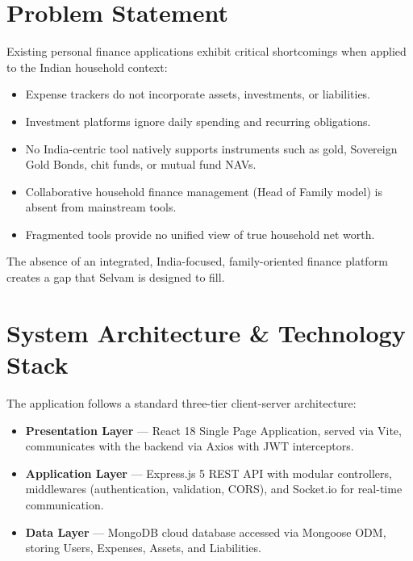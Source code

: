 \documentclass[12pt,a4paper]{article}
\begin{document}
\section{Problem Statement}

Existing personal finance applications exhibit critical shortcomings when applied to the Indian household context:

\begin{itemize}[noitemsep, leftmargin=*]
  \item Expense trackers do not incorporate assets, investments, or liabilities.
  \item Investment platforms ignore daily spending and recurring obligations.
  \item No India-centric tool natively supports instruments such as gold, Sovereign Gold Bonds, chit funds, or mutual fund NAVs.
  \item Collaborative household finance management (Head of Family model) is absent from mainstream tools.
  \item Fragmented tools provide no unified view of true household net worth.
\end{itemize}

The absence of an integrated, India-focused, family-oriented finance platform creates a gap that Selvam is designed to fill.

\section{System Architecture \& Technology Stack}

The application follows a standard three-tier client-server architecture:

\begin{itemize}[noitemsep, leftmargin=*]
  \item \textbf{Presentation Layer} --- React 18 Single Page Application, served via Vite, communicates with the backend via Axios with JWT interceptors.
  \item \textbf{Application Layer} --- Express.js 5 REST API with modular controllers, middlewares (authentication, validation, CORS), and Socket.io for real-time communication.
  \item \textbf{Data Layer} --- MongoDB cloud database accessed via Mongoose ODM, storing Users, Expenses, Assets, and Liabilities.
\end{itemize}
\end{document}
